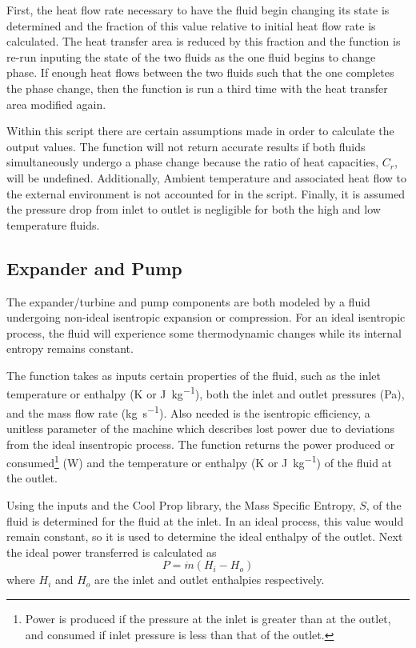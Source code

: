 First, the heat flow rate necessary to have the fluid begin changing its state is determined and the fraction of this value relative to initial heat flow rate is calculated. 
The heat transfer area is reduced by this fraction and the function is re-run inputing the state of the two fluids as the one fluid begins to change phase. If enough heat flows between the two fluids such that the one completes the phase change, then the function is run a third time with the heat transfer area modified again. 

Within this script there are certain assumptions made in order to calculate the output values. The function will not return accurate results if both fluids simultaneously undergo a phase change because the ratio of heat capacities, $C_r$, will be undefined. Additionally, Ambient temperature and associated heat flow to the external environment is not accounted for in the script. Finally, it is assumed the pressure drop from inlet to outlet is negligible for both the high and low temperature fluids. 

\subsection{Expander and Pump}
The expander/turbine and pump components are both modeled by a fluid undergoing non-ideal isentropic expansion or compression. For an ideal isentropic process, the fluid will experience some thermodynamic changes while its internal entropy remains constant. 

The function takes as inputs certain properties of the fluid, such as the inlet temperature or enthalpy (\si{\kelvin} or \si{\joule\per\kilogram}), both the inlet and outlet pressures (\si{\pascal}), and the mass flow rate (\si{\kilogram\per\second}). Also needed is the isentropic efficiency, a unitless parameter of the machine which describes lost power due to deviations from the ideal insentropic process. The function returns the power produced or consumed\footnote{Power is produced if the pressure at the inlet is greater than at the outlet, and consumed if inlet pressure is less than that of the outlet.} (\si{\watt}) and the temperature or enthalpy (\si{\kelvin} or \si{\joule\per\kilogram}) of the fluid at the outlet.

Using the inputs and the Cool Prop library, the Mass Specific Entropy, $S$, of the fluid is determined for the fluid at the inlet. In an ideal process, this value would remain constant, so it is used to determine the ideal enthalpy of the outlet. Next the ideal power transferred is calculated as 
\begin{equation}
\label{eq:power_enthalpy}
P = \dot{m} \left(H_i - H_o\right)
\end{equation}
where $H_i$ and $H_o$ are the inlet and outlet enthalpies respectively.

